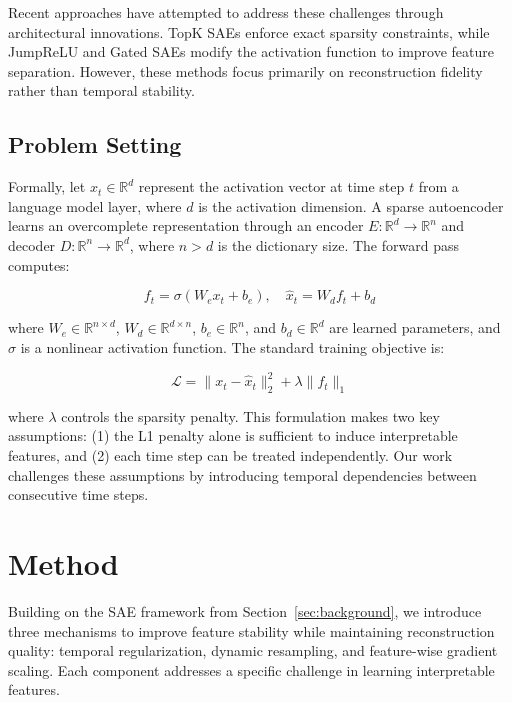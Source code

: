 \documentclass{article} %
\begin{document}
Recent approaches have attempted to address these challenges through architectural innovations. TopK SAEs \cite{bussmannBatchTopKSparseAutoencoders2024} enforce exact sparsity constraints, while JumpReLU \cite{rajamanoharanJumpingAheadImproving2024} and Gated SAEs \cite{rajamanoharanImprovingDictionaryLearning2024} modify the activation function to improve feature separation. However, these methods focus primarily on reconstruction fidelity rather than temporal stability.

\subsection{Problem Setting}
Formally, let $x_t \in \mathbb{R}^d$ represent the activation vector at time step $t$ from a language model layer, where $d$ is the activation dimension. A sparse autoencoder learns an overcomplete representation through an encoder $E: \mathbb{R}^d \rightarrow \mathbb{R}^n$ and decoder $D: \mathbb{R}^n \rightarrow \mathbb{R}^d$, where $n > d$ is the dictionary size. The forward pass computes:

\begin{equation}
    f_t = \sigma(W_ex_t + b_e), \quad \hat{x}_t = W_df_t + b_d
\end{equation}

where $W_e \in \mathbb{R}^{n \times d}$, $W_d \in \mathbb{R}^{d \times n}$, $b_e \in \mathbb{R}^n$, and $b_d \in \mathbb{R}^d$ are learned parameters, and $\sigma$ is a nonlinear activation function. The standard training objective is:

\begin{equation}
    \mathcal{L} = \|x_t - \hat{x}_t\|_2^2 + \lambda\|f_t\|_1
\end{equation}

where $\lambda$ controls the sparsity penalty. This formulation makes two key assumptions: (1) the L1 penalty alone is sufficient to induce interpretable features, and (2) each time step can be treated independently. Our work challenges these assumptions by introducing temporal dependencies between consecutive time steps.

\section{Method}
\label{sec:method}

Building on the SAE framework from Section~\ref{sec:background}, we introduce three mechanisms to improve feature stability while maintaining reconstruction quality: temporal regularization, dynamic resampling, and feature-wise gradient scaling. Each component addresses a specific challenge in learning interpretable features.
\end{document}
